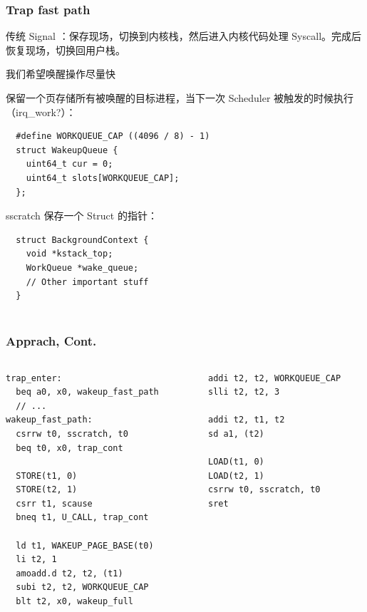 \documentclass[UTF-8]{ctexbeamer}
\begin{document}
\begin{frame}[fragile]
  \frametitle{Trap fast path}

  传统 Signal ：保存现场，切换到内核栈，然后进入内核代码处理 Syscall。完成后恢复现场，切换回用户栈。

  我们希望唤醒操作尽量快

  \pause
  \vspace*{1em}

  保留一个页存储所有被唤醒的目标进程，当下一次 Scheduler 被触发的时候执行（irq\_work?）：

  \begin{verbatim}
  #define WORKQUEUE_CAP ((4096 / 8) - 1)
  struct WakeupQueue {
    uint64_t cur = 0;
    uint64_t slots[WORKQUEUE_CAP];
  };
  \end{verbatim}

  sscratch 保存一个 Struct 的指针：

  \begin{verbatim}
  struct BackgroundContext {
    void *kstack_top;
    WorkQueue *wake_queue;
    // Other important stuff
  }
    
  \end{verbatim}

\end{frame}

\begin{frame}[fragile]
  \frametitle{Apprach, Cont.}

  \small

  \begin{columns}
    \begin{column}{0.5\textwidth}
      \begin{verbatim}
trap_enter:
  beq a0, x0, wakeup_fast_path
  // ...
wakeup_fast_path:
  csrrw t0, sscratch, t0 
  beq t0, x0, trap_cont

  STORE(t1, 0)
  STORE(t2, 1)
  csrr t1, scause
  bneq t1, U_CALL, trap_cont

  ld t1, WAKEUP_PAGE_BASE(t0)
  li t2, 1
  amoadd.d t2, t2, (t1)
  subi t2, t2, WORKQUEUE_CAP
  blt t2, x0, wakeup_full
      \end{verbatim}
    \end{column}
    \begin{column}{0.5\textwidth}
      \begin{verbatim}
  addi t2, t2, WORKQUEUE_CAP
  slli t2, t2, 3

  addi t2, t1, t2
  sd a1, (t2)

  LOAD(t1, 0)
  LOAD(t2, 1)
  csrrw t0, sscratch, t0
  sret
      \end{verbatim}
    \end{column}
  \end{columns}
\end{frame}
\end{document}
